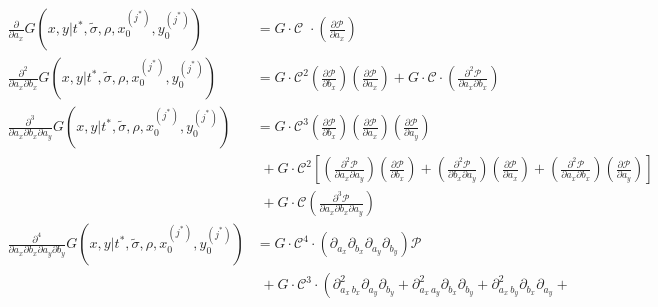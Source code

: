 \documentclass[10pt]{article}
\begin{document}
\begin{align}
  \frac{\partial}{\partial a_x} G(x,y|t^{*}, \tilde{\sigma}, \rho, x_0^{(j^*)}, y_0^{(j^*)}) &= G \cdot \mathcal{C}\,\,\cdot \left( \frac{\partial \mathcal{P}}{\partial a_x} \right)\\
  \frac{\partial^2}{\partial a_x \partial b_x} G(x,y|t^{*}, \tilde{\sigma}, \rho, x_0^{(j^*)}, y_0^{(j^*)}) &= G \cdot \mathcal{C}^2 \left( \frac{\partial \mathcal{P}}{\partial b_x} \right) \left( \frac{\partial \mathcal{P}}{\partial a_x} \right) + G \cdot \mathcal{C} \cdot \left( \frac{\partial^2 \mathcal{P}}{\partial a_x \partial b_x} \right) \\
  \frac{\partial^3}{\partial a_x \partial b_x \partial a_y} G(x,y|t^{*}, \tilde{\sigma}, \rho, x_0^{(j^*)}, y_0^{(j^*)}) &= G \cdot \mathcal{C}^3 \left( \frac{\partial \mathcal{P}}{\partial b_x} \right) \left( \frac{\partial \mathcal{P}}{\partial a_x} \right) \left( \frac{\partial \mathcal{P}}{\partial a_y} \right) \nonumber \\
                                                                                             &\,\, + G \cdot \mathcal{C}^2 \left[\left( \frac{\partial^2 \mathcal{P}}{\partial a_x \partial a_y} \right) \left( \frac{\partial \mathcal{P}}{\partial b_x} \right) + \left( \frac{\partial^2 \mathcal{P}}{\partial b_x \partial a_y} \right) \left( \frac{\partial \mathcal{P}}{\partial a_x} \right) + \left( \frac{\partial^2 \mathcal{P}}{\partial a_x \partial b_x} \right) \left( \frac{\partial \mathcal{P}}{\partial a_y} \right)\right] \nonumber \\
                                                                                             &\,\, + G \cdot \mathcal{C} \left( \frac{\partial^3 \mathcal{P}}{\partial a_x \partial b_x \partial a_y} \right) \nonumber \\
  \frac{\partial^4}{\partial a_x \partial b_x \partial a_y \partial b_y} G(x,y|t^{*}, \tilde{\sigma}, \rho, x_0^{(j^*)}, y_0^{(j^*)}) &= G \cdot \mathcal{C}^4 \cdot \left(\partial_{a_x}\partial_{b_x} \partial_{a_y}\partial_{b_y} \right)\mathcal{P} \nonumber \\
                                                                                             &\,\, + G \cdot \mathcal{C}^3 \cdot \left( \partial^2_{a_x\, b_x} \partial_{a_y} \partial_{b_y} + \partial^2_{a_x\, a_y} \partial_{b_x} \partial_{b_y} + \partial^2_{a_x\, b_y} \partial_{b_x} \partial_{a_y} + \right. \nonumber \\

\end{align}
\end{document}
